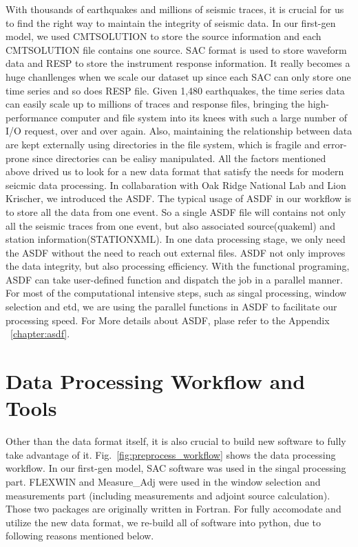 With thousands of earthquakes and millions of seismic traces, it is crucial for
us to find the right way to maintain the integrity of seismic data.
In our first-gen model, we used CMTSOLUTION to store the source information and each
CMTSOLUTION file contains one source. SAC format is used to store waveform data and
RESP to store the instrument response information. It really becomes a huge chanllenges
when we scale our dataset up since each SAC can only store one time series and so
does RESP file. Given 1,480 earthquakes, the time series data can easily scale up to millions
of traces and response files, bringing the high-performance computer and file system
into its knees with such a large number of I/O request, over and over again.
Also, maintaining the relationship between data are kept externally using directories
in the file system,
which is fragile and error-prone since directories can be ealisy manipulated.
All the factors mentioned above drived us to
look for a new data format that satisfy the needs for modern seicmic data processing.
In collabaration with Oak Ridge National Lab and Lion Krischer, we introduced the 
ASDF. The typical usage of ASDF in our workflow is to store all the data from one
event. So a single ASDF file will contains not only all the seismic traces from one
event, but also associated source(quakeml) and station information(STATIONXML).
In one data processing stage, we only need the ASDF without the need to reach out
external files. ASDF not only improves the data integrity, but also processing efficiency.
With the functional programing, ASDF can take user-defined function and dispatch the job
in a parallel manner. For most of the computational intensive steps, such as singal
processing, window selection and etd, we are using the parallel functions in ASDF
to facilitate our processing speed.
For More details about ASDF, plase refer to the Appendix ~\ref{chapter:asdf}.


\section{Data Processing Workflow and Tools}
\label{section:data_processing}

Other than the data format itself, it is also crucial to build new software
to fully take advantage of it.
Fig.~\ref{fig:preprocess_workflow} shows the data processing workflow.
In our first-gen model, SAC software was used in the singal processing part.
FLEXWIN and Measure\_Adj were used in the window selection and measurements part
(including measurements and adjoint source calculation).
Those two packages are originally written in Fortran. For fully accomodate
and utilize the new  data format, we re-build all of software into python,
due to following reasons mentioned below.

